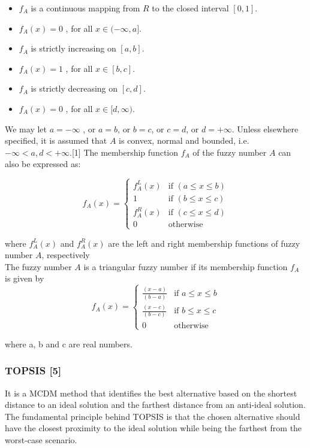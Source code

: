 \documentclass[12pt,a4paper]{article}
\begin{document}
\begin{itemize}

    \item $f_{A}$ is a continuous mapping from $R$ to the closed interval $[0,1]$.

    \item $f_{A}(x) = 0$ , for all $x \in (-\infty , a]$. 
    \item $f_{A}$ is strictly increasing on $[a, b]$.

    \item $f_{A}(x) = 1$ , for all $x \in [b , c]$.
    \item $f_{A}$ is strictly decreasing on $[c, d]$.

    \item $f_{A}(x) = 0$ , for all $x \in [d , \infty )$.
    
\end{itemize}
\hspace{1em}We may let $a = -\infty$ , or $a = b$, or $b =  c$, or $c = d$, or $d = +\infty$. Unless elsewhere specified, it is assumed that $A$ is
convex, normal and bounded, i.e. $-\infty < a, d < +\infty$.[1]
The membership function $f_{A}$ of the fuzzy number $A$ can also
be expressed as:


\[
f_A(x) =
\begin{cases} 
f^L_A(x) & \text{if } (a \leq x \leq b) \\
1 & \text{if } (b \leq x \leq c) \\
f^R_A(x) & \text{if } (c \leq x \leq d) \\
0 & \text{otherwise}
\end{cases}
\]

where $f^{L}_{A}(x)$ and $f^{R}_{A}(x)$ are the left and right membership functions of fuzzy number $A$, respectively\\
The fuzzy number $A$ is a triangular fuzzy number if its membership function $f_{A}$ is given by
\[
f_A(x) =
\begin{cases} 
\frac{(x - a)}{(b - a)} & \text{if } a \leq x \leq b \\
\frac{(x - c)}{(b - c)} & \text{if } b \leq x \leq c \\
0 & \text{otherwise}
\end{cases}
\]

where a, b and c are real numbers.



\subsubsection*{TOPSIS [5]}
\hspace{1em}It is a MCDM method that identifies the best alternative based on the shortest distance to an ideal solution and the farthest distance from an anti-ideal solution. The fundamental principle behind TOPSIS is that the chosen alternative should have the closest proximity to the ideal solution while being the farthest from the worst-case scenario.
\end{document}
